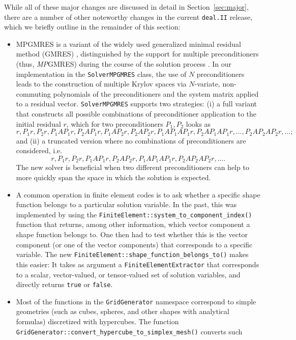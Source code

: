 \documentclass{ansarticle-preprint}
\newcommand{\specialword}[1]{\texttt{#1}}
\newcommand{\dealii}{{\specialword{deal.II}}\xspace}
\begin{document}
While all of these major changes are discussed in detail in
Section~\ref{sec:major}, there
are a number of other noteworthy changes in the current \dealii release,
which we briefly outline in the remainder of this section:
%
\begin{itemize}
\item MPGMRES is a variant of the
  widely used generalized minimal residual method (GMRES)
  \cite{Saad1986gmres}, distinguished by the support for multiple
  preconditioners (thus, \textit{MP}GMRES)  during the course of the solution process
  \cite{Greif2016gmres}. In our implementation in the
  \texttt{SolverMPGMRES} class, the use of $N$ preconditioners leads
  to the construction of multiple Krylov spaces via
  $N$-variate, non-commuting polynomials of the preconditioners and the system
  matrix applied to a residual vector. \texttt{SolverMPGMRES}
  supports two strategies: (i) a full variant that constructs all possible
  combinations of preconditioner application to the initial residual $r$,
  which for two preconditioners $P_1, P_2$ looks as
  \[
    r, P_1r, P_2r, P_1AP_1r, P_2AP_1r, P_1AP_2r, P_2AP_2r, P_1AP_1AP_1r,
   P_2AP_1AP_1r, \ldots, P_2AP_2AP_2r, \ldots;
 \]
 and (ii) a truncated version where no combinations of preconditioners are considered, i.e.
 \[
    r, P_1r, P_2r, P_1AP_1r, P_2AP_2r, P_1AP_1AP_1r,
   P_2AP_2AP_2r, \ldots.
 \]
 The new solver is beneficial when two different preconditioners can help to
 more quickly span the space in which the solution is expected.
\item A common operation in finite element codes is to ask whether
  a specific shape function belongs to a particular solution
  variable. In the past, this was implemented by using the
  \texttt{FiniteElement::system\_to\_component\_index()} function that
  returns, among other information, which vector component a shape
  function belongs to. One then had to test whether this is the vector
  component (or one of the vector components) that corresponds to a
  specific variable. The new
  \texttt{FiniteElement::shape\_function\_belongs\_to()} makes this
  easier: It takes as argument a \texttt{FiniteElementExtractor} that
  corresponds to a scalar, vector-valued, or tensor-valued set of
  solution variables, and directly returns \texttt{true} or
  \texttt{false}.
\item Most of the functions in the \texttt{GridGenerator} namespace correspond
  to simple geometries (such as cubes, spheres, and other shapes with analytical
  formulas) discretized with hypercubes. The function
  \texttt{GridGenerator::convert\_hypercube\_to\_simplex\_mesh()} converts such

\end{itemize}
\end{document}
